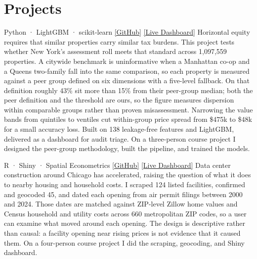 \section{Projects}

          {Python · LightGBM · scikit-learn}
          {\href{https://github.com/Rodrigofch7/nyc_property_taxes_local}{[GitHub]} \enspace \href{https://nycpropertytaxes.streamlit.app/}{[Live Dashboard]}}
          {Horizontal equity requires that similar properties carry similar tax burdens. This project tests whether New York's assessment roll meets that standard across 1,097,559 properties. A citywide benchmark is uninformative when a Manhattan co-op and a Queens two-family fall into the same comparison, so each property is measured against a peer group defined on six dimensions with a five-level fallback. On that definition roughly 43\% sit more than 15\% from their peer-group median; both the peer definition and the threshold are ours, so the figure measures dispersion within comparable groups rather than proven misassessment. Narrowing the value bands from quintiles to ventiles cut within-group price spread from \$475k to \$48k for a small accuracy loss. Built on 138 leakage-free features and LightGBM, delivered as a dashboard for audit triage. On a three-person course project I designed the peer-group methodology, built the pipeline, and trained the models.}

          {R · Shiny · Spatial Econometrics}
          {\href{https://github.com/Rodrigofch7/data-centers-urban-effects}{[GitHub]} \enspace \href{https://rodrigofrancac.shinyapps.io/project-datacenter-urban-effects/}{[Live Dashboard]}}
          {Data center construction around Chicago has accelerated, raising the question of what it does to nearby housing and household costs. I scraped 124 listed facilities, confirmed and geocoded 45, and dated each opening from air permit filings between 2000 and 2024. Those dates are matched against ZIP-level Zillow home values and Census household and utility costs across 660 metropolitan ZIP codes, so a user can examine what moved around each opening. The design is descriptive rather than causal: a facility opening near rising prices is not evidence that it caused them. On a four-person course project I did the scraping, geocoding, and Shiny dashboard.}


